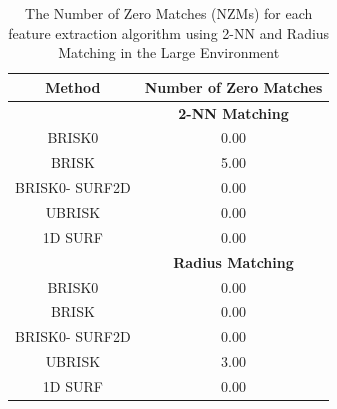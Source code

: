 \documentclass{report}
\begin{document}
% 
%




\begin{table}
\caption{The Number of Zero Matches (NZMs) for each feature extraction algorithm
using 2-NN and Radius Matching in the Large Environment}
\begin{tabular}{|c|c|}
\hline 
\textbf{Method} & \textbf{Number of Zero Matches}\tabularnewline
\hline 
 & \textbf{2-NN Matching}\tabularnewline
\hline 
\hline 
BRISK0 & 0.00\tabularnewline
\hline 
BRISK & 5.00\tabularnewline
\hline 
BRISK0- SURF2D & 0.00\tabularnewline
\hline 
UBRISK & 0.00\tabularnewline
\hline 
1D SURF & 0.00\tabularnewline
\hline 
 & \textbf{Radius Matching}\tabularnewline
\hline 
BRISK0 & 0.00\tabularnewline
\hline 
BRISK & 0.00\tabularnewline
\hline 
BRISK0- SURF2D & 0.00\tabularnewline
\hline 
UBRISK & 3.00\tabularnewline
\hline 
1D SURF & 0.00\tabularnewline
\hline 
\end{tabular}
\label{tab:lh_nzm}
\end{table}
\end{document}
